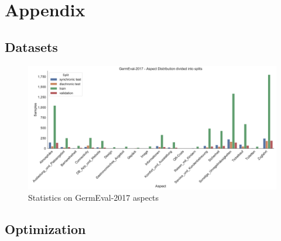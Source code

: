\chapter{Appendix}

\section{Datasets}

\begin{figure}[ht]
	\centering
	\includegraphics[width=\textwidth]{figures/08_appendix/08_germevalAspects}
	\caption{Statistics on GermEval-2017 aspects}
	\label{fig:08_germEvalStatistics}
\end{figure}

\section{Optimization}

